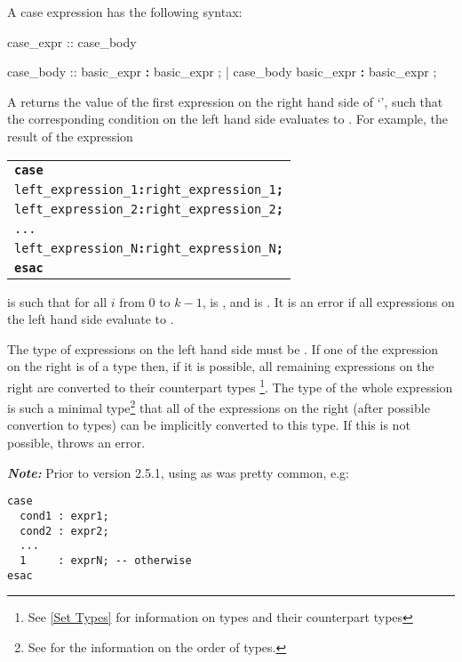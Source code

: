A case expression has the following syntax:
%
\begin{Grammar}
case_expr ::  case_body 

case_body ::
        basic_expr \textbf{:} basic_expr {;}
      | case_body basic_expr \textbf{:} basic_expr {;}
\end{Grammar}

\noindent A  returns the value of the first
expression on the right hand side of `\code{:}', such that the
corresponding condition on the left hand side evaluates to
.
%
For example, the result of the expression
\begin{alltt}
\begin{tabular}{l}
\textbf{case}\\
 left_expression_1 \textbf{:} right_expression_1 \textbf{;}\\
 left_expression_2 \textbf{:} right_expression_2 \textbf{;}\\
 ...\\
 left_expression_N \textbf{:} right_expression_N \textbf{;}\\
\textbf{esac}
\end{tabular}
\end{alltt}

\noindent is  such that for all $i$ from
$0$ to $k-1$,  is , and
 is .
%
It is an error if all expressions on the left hand side evaluate
to .

The type of expressions on the left hand side must be \Boolean.  If
one of the expression on the right is of a \Set type then, if it is
possible, all remaining expressions on the right are converted to
their counterpart \Set types \footnote{See \ref{Set Types} for
information on \Set types and their counterpart types}. The type of
the whole expression is such a minimal type\footnote{See  for the information on the order of types.} that all of the
expressions on the right (after possible convertion to \Set types) can
be implicitly converted to this type.
%
If this is not possible, \nusmv throws an error.

\bigskip
\textbf{\textit{Note:}}
\label{ref::caseconditionexample}
Prior to version 2.5.1, using 
as  was pretty common, e.g:
\begin{verbatim}
case
  cond1 : expr1;
  cond2 : expr2;
  ...
  1     : exprN; -- otherwise
esac
\end{verbatim}

